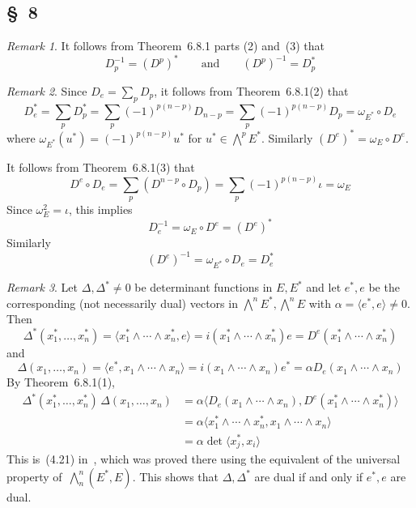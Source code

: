 \documentclass[letterpaper,12pt]{article}
\newcommand{\after}{\circ}
\newcommand{\eprod}{\wedge}
\newcommand{\bigeprod}{\bigwedge}
\newcommand{\medeprod}{{\textstyle\bigeprod}}
\newcommand{\sprod}[2]{\langle#1,#2\rangle}
\newcommand{\multi}[4]{#2_{#3}#1\cdots#1#2_{#4}}
\newcommand{\eprods}[3]{\multi{\eprod}{#1}{#2}{#3}}
\theoremstyle{definition}
\theoremstyle{remark}
\newtheorem*{rmk}{Remark}
\begin{document}
\subsection*{\S~8}
\begin{rmk}
It follows from Theorem~6.8.1 parts (2) and~(3) that
\[D_p^{-1}=(D^p)^*\qquad\text{and}\qquad(D^p)^{-1}=D_p^*\]
\end{rmk}

\begin{rmk}
Since \(D_e=\sum_p D_p\), it follows from Theorem~6.8.1(2) that
\[D_e^*=\sum_p D_p^*=\sum_p(-1)^{p(n-p)}D_{n-p}=\sum_p(-1)^{p(n-p)}D_p=\omega_{E^*}\after D_e\]
where \(\omega_{E^*}(u^*)=(-1)^{p(n-p)}u^*\) for \(u^*\in\medeprod^p E^*\). Similarly \((D^e)^*=\omega_E\after D^e\).

It follows from Theorem~6.8.1(3) that
\[D^e\after D_e=\sum_p(D^{n-p}\after D_p)=\sum_p(-1)^{p(n-p)}\iota=\omega_E\]
Since \(\omega_E^2=\iota\), this implies
\[D_e^{-1}=\omega_E\after D^e=(D^e)^*\]
Similarly
\[(D^e)^{-1}=\omega_{E^*}\after D_e=D_e^*\]
\end{rmk}

\begin{rmk}
Let \(\Delta,\Delta^*\ne 0\) be determinant functions in \(E,E^*\) and let \(e^*,e\) be the corresponding (not necessarily dual) vectors in \(\medeprod^n E^*,\medeprod^n E\) with \(\alpha=\sprod{e^*}{e}\ne 0\). Then
\[\Delta^*(x^*_1,\ldots,x^*_n)=\sprod{\eprods{x^*}{1}{n}}{e}=i(\eprods{x^*}{1}{n})e=D^e(\eprods{x^*}{1}{n})\]
and
\[\Delta(x_1,\ldots,x_n)=\sprod{e^*}{\eprods{x}{1}{n}}=i(\eprods{x}{1}{n})e^*=\alpha D_e(\eprods{x}{1}{n})\]
By Theorem~6.8.1(1),
\begin{align*}
\Delta^*(x^*_1,\ldots,x^*_n)\,\Delta(x_1,\ldots,x_n)&=\alpha\sprod{D_e(\eprods{x}{1}{n})}{D^e(\eprods{x^*}{1}{n})}\\
	&=\alpha\sprod{\eprods{x^*}{1}{n}}{\eprods{x}{1}{n}}\\
	&=\alpha\det\sprod{x^*_j}{x_i}
\end{align*}
This is~(4.21) in~\cite{greub1}, which was proved there using the equivalent of the universal property of~\(\medeprod^n_n(E^*,E)\). This shows that \(\Delta,\Delta^*\) are dual if and only if \(e^*,e\) are dual.
\end{rmk}
\end{document}

